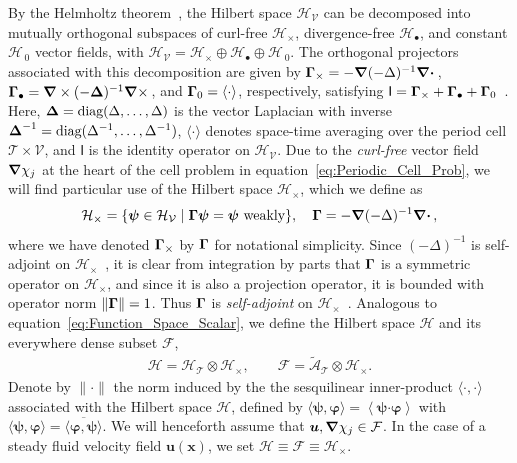\documentclass[leqno,onefignum,onetabnum]{siamltex1213}
\newcommand{\Tc}{\mathcal{T}}
\newcommand{\Vc}{\mathcal{V}}
\newcommand{\Hc}{\mathcal{H}}
\newcommand{\Fc}{\mathcal{F}}
\newcommand{\Ac}{\mathcal{A}}
\newcommand{\Ib}{\mathsf{I}}
\newcommand\bDelta{\mbox{\boldmath${\Delta}$}}
\newcommand\bGamma{\mbox{\boldmath${\Gamma}$}}
\newcommand\bnabla{\mbox{\boldmath${\nabla}$}}
\providecommand\bcdot{\boldsymbol{\cdot}}
\newcommand{\vecx}{\boldsymbol{x}}
\newcommand{\vecu}{\boldsymbol{u}}
\newcommand{\vecpsi}{\boldsymbol{\psi}}
\newcommand{\vecvarphi}{\boldsymbol{\varphi}}
\begin{document}
By the Helmholtz theorem~\cite{Denaro:2003:0271,Bhatia:IEE:1077}, the
Hilbert space $\Hc_{\Vc}$ can be decomposed into mutually orthogonal
subspaces of curl-free $\Hc_\times$, divergence-free $\Hc_\bullet$, and constant
$\Hc_{\,0}$ vector fields, with $\Hc_{\Vc}=\Hc_\times\oplus\Hc_\bullet\oplus\Hc_{\,0}$.  The orthogonal projectors associated with this decomposition are given by 
$\bGamma_\times=-\bnabla(-\Delta)^{-1}\bnabla \bcdot\,$,
$\bGamma_\bullet=\bnabla\times(-\bDelta)^{-1}\bnabla \times\,$, and $\bGamma_0=\langle\cdot\rangle$, 
respectively, satisfying
$\Ib=\bGamma_\times+\bGamma_\bullet+\bGamma_0$~\cite{Fannjiang:1994:SIAM_JAM:333,MILTON:2002:TC}. Here, 
$\bDelta=\text{diag}(\Delta,\ldots,\Delta)$ is the vector Laplacian with inverse
$\bDelta^{-1}=\text{diag}(\Delta^{-1},\ldots,\Delta^{-1})$, $\langle\cdot\rangle$ denotes space-time
averaging over the period cell $\Tc\times\Vc$, and $\Ib$ is the identity
operator on $\Hc_{\Vc}$. Due to the \emph{curl-free} vector field
$\bnabla\chi_j$ at the heart of the cell problem in
equation~\eqref{eq:Periodic_Cell_Prob}, we will find particular use of
the Hilbert space $\Hc_\times$, which we define as 
%
\begin{align}\label{eq:Hilbert_Curl_Free}
  \Hc_\times=\{\vecpsi\in\Hc_{\Vc} \; | \; \bGamma\vecpsi=\vecpsi \text{ weakly}\},
  \quad
  \bGamma=-\bnabla(-\Delta)^{-1}\bnabla \bcdot\,,
\end{align}
%
where we have denoted $\bGamma_\times$ by $\bGamma$ for notational
simplicity. Since $(-\Delta)^{-1}$ is self-adjoint on
$\Hc_\times$~\cite{Stakgold:BVP:2000}, it is clear from integration by parts
that $\bGamma$ is a symmetric operator on $\Hc_\times$, and since it is also
a projection operator, it is bounded with operator norm
$\|\bGamma\|=1$. Thus $\bGamma$ is \emph{self-adjoint} on
$\Hc_\times$~\cite{Stone:64,Reed-1980}.  Analogous to
equation~\eqref{eq:Function_Space_Scalar}, we define the Hilbert space
$\Hc$ and its everywhere dense subset $\Fc$,   
%
\begin{align}\label{eq:Function_Space_Vector} 
  \Hc=\Hc_{\Tc}\otimes\Hc_\times,  \qquad
  \Fc=\tilde{\Ac}_{\Tc}\otimes\Hc_\times.
\end{align}
%
Denote by $\|\cdot\|$ the norm induced by the the sesquilinear inner-product
$\langle\cdot,\cdot\rangle$ associated with the Hilbert space $\Hc$, 
defined by $\langle\vecpsi,\vecvarphi\rangle=\left\langle\vecpsi\bcdot\vecvarphi\right\rangle$
with $\langle\vecpsi,\vecvarphi\rangle=\overline{\langle\vecvarphi,\vecpsi\rangle}$. We will
henceforth assume that $\vecu,\bnabla\chi_j\in\Fc$. In the case of a steady fluid
velocity field $\vecu(\vecx)$, we set $\Hc\equiv\Fc\equiv\Hc_\times$.
\end{document}
